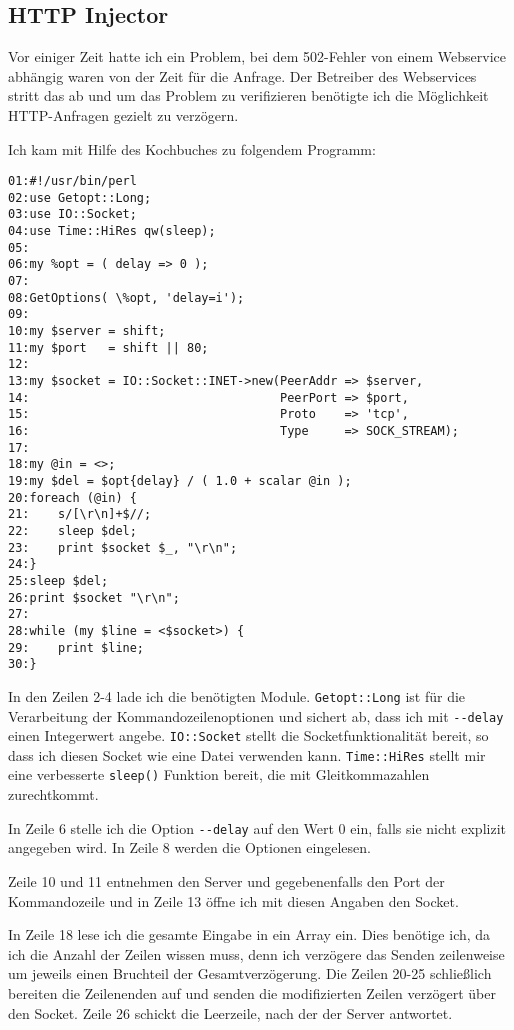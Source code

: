 \begin{normaltext}
  \subsection{HTTP Injector}

  Vor einiger Zeit hatte ich ein Problem, bei dem 502-Fehler von
  einem Webservice abhängig waren von der Zeit für die
  Anfrage. Der Betreiber des Webservices stritt das ab und um das
  Problem zu verifizieren benötigte ich die Möglichkeit HTTP-Anfragen gezielt
  zu verzögern.
  
  Ich kam mit Hilfe des Kochbuches zu folgendem Programm:
  \begin{verbatim}
01:#!/usr/bin/perl
02:use Getopt::Long;
03:use IO::Socket;
04:use Time::HiRes qw(sleep);
05:
06:my %opt = ( delay => 0 );
07:
08:GetOptions( \%opt, 'delay=i');
09:
10:my $server = shift;
11:my $port   = shift || 80;
12:
13:my $socket = IO::Socket::INET->new(PeerAddr => $server,
14:                                   PeerPort => $port,
15:                                   Proto    => 'tcp',
16:                                   Type     => SOCK_STREAM);
17:
18:my @in = <>;
19:my $del = $opt{delay} / ( 1.0 + scalar @in );
20:foreach (@in) {
21:    s/[\r\n]+$//;
22:    sleep $del;
23:    print $socket $_, "\r\n";
24:}
25:sleep $del;
26:print $socket "\r\n";
27:
28:while (my $line = <$socket>) {
29:    print $line;
30:}
  \end{verbatim}
  In den Zeilen 2-4 lade ich die benötigten Module. \verb?Getopt::Long? ist
  für die Verarbeitung der Kommandozeilenoptionen und sichert ab, dass ich mit
  \verb?--delay? einen Integerwert angebe. \verb?IO::Socket? stellt die
  Socketfunktionalität bereit, so dass ich diesen Socket wie eine Datei
  verwenden kann. \verb?Time::HiRes? stellt mir eine verbesserte
  \verb?sleep()? Funktion bereit, die mit Gleitkommazahlen zurechtkommt.

  In Zeile 6 stelle ich die Option \verb?--delay? auf den Wert 0 ein, falls
  sie nicht explizit angegeben wird. In Zeile 8 werden die Optionen
  eingelesen.

  Zeile 10 und 11 entnehmen den Server und gegebenenfalls den Port der
  Kommandozeile und in Zeile 13 öffne ich mit diesen Angaben den Socket.

  In Zeile 18 lese ich die gesamte Eingabe in ein Array ein. Dies benötige
  ich, da ich die Anzahl der Zeilen wissen muss, denn ich verzögere das Senden
  zeilenweise um jeweils einen Bruchteil der Gesamtverzögerung. Die Zeilen
  20-25 schließlich bereiten die Zeilenenden auf und senden die modifizierten
  Zeilen verzögert über den Socket. Zeile 26 schickt die Leerzeile, nach der
  der Server antwortet.


\end{normaltext}
